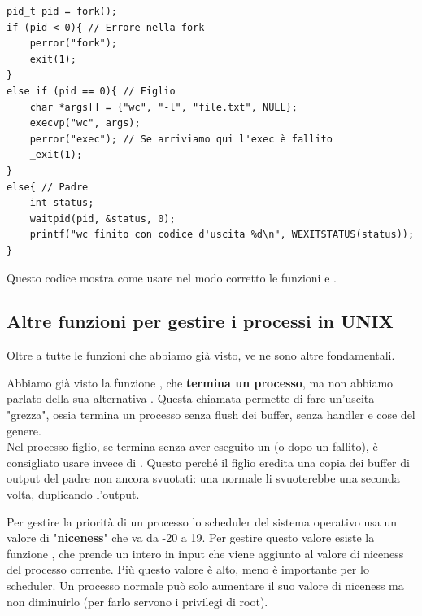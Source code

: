 \documentclass[11pt, a4paper, titlepage, oneside]{scrbook}
\begin{document}
\begin{lstlisting}[style=C]
pid_t pid = fork();
if (pid < 0){ // Errore nella fork
    perror("fork");
    exit(1);
}
else if (pid == 0){ // Figlio
    char *args[] = {"wc", "-l", "file.txt", NULL};
    execvp("wc", args);
    perror("exec"); // Se arriviamo qui l'exec è fallito
    _exit(1);
}
else{ // Padre
    int status;
    waitpid(pid, &status, 0);
    printf("wc finito con codice d'uscita %d\n", WEXITSTATUS(status));
}
\end{lstlisting}
Questo codice mostra come usare nel modo corretto le funzioni  e . 

\subsection{Altre funzioni per gestire i processi in UNIX}

Oltre a tutte le funzioni che abbiamo già visto, ve ne sono altre fondamentali.

\begin{Definizione}
\label{def-exit}
Abbiamo già visto la funzione , che \textbf{termina un processo}, ma non abbiamo parlato della sua alternativa . Questa chiamata permette di fare un'uscita "grezza", ossia termina un processo senza flush dei buffer, senza handler e cose del genere. \\
\NB Nel processo figlio, se termina senza aver eseguito un  (o dopo un  fallito), è consigliato usare  invece di . Questo perché il figlio eredita una copia dei buffer di output del padre non ancora svuotati: una  normale li svuoterebbe una seconda volta, duplicando l'output.
\end{Definizione}

\begin{Definizione}
\label{def-nice()}
Per gestire la priorità di un processo lo scheduler del sistema operativo usa un valore di "\textbf{niceness}" che va da -20 a 19. Per gestire questo valore esiste la funzione , che prende un intero in input che viene aggiunto al valore di niceness del processo corrente. Più questo valore è alto, meno è importante per lo scheduler. Un processo normale può solo aumentare il suo valore di niceness ma non diminuirlo (per farlo servono i privilegi di root).
\end{Definizione}
\end{document}
